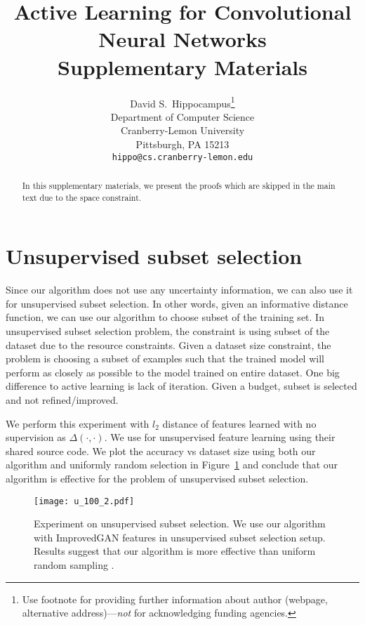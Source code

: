\documentclass{article}
\title{Active Learning for Convolutional Neural Networks\\ Supplementary Materials}
\author{
  David S.~Hippocampus\thanks{Use footnote for providing further
    information about author (webpage, alternative
    address)---\emph{not} for acknowledging funding agencies.} \\
  Department of Computer Science\\
  Cranberry-Lemon University\\
  Pittsburgh, PA 15213 \\
  \texttt{hippo@cs.cranberry-lemon.edu} \\
}
\begin{document}

\maketitle

\begin{abstract}
In this supplementary materials, we present the proofs which are skipped in the main text due to the space constraint.
\end{abstract}


\section{Unsupervised subset selection} 

Since our algorithm does not use any uncertainty information, we can also use it for unsupervised subset selection. In other words, given an informative distance function, we can use our algorithm to choose subset of the training set. In unsupervised subset selection problem, the constraint is using subset of the dataset due to the resource constraints. Given a dataset size constraint, the problem is choosing a subset of examples such that the trained model will perform as closely as possible to the model trained on entire dataset. One big difference to active learning is lack of iteration. Given a budget, subset is selected and not refined/improved.


We perform this experiment with $l_2$ distance of features learned with no supervision as $\Delta(\cdot,\cdot)$. We use \cite{improved_gan} for unsupervised feature learning using their shared source code. We plot the accuracy vs dataset size using both our algorithm and uniformly random selection in Figure~\ref{fig:scat} and conclude that our algorithm is effective for the problem of unsupervised subset selection.  

\begin{figure}[t]
\texttt{[image: u\_100\_2.pdf]}
\caption{Experiment on unsupervised subset selection. We use our algorithm with ImprovedGAN\cite{improved_gan} features in unsupervised subset selection setup. Results suggest that our algorithm is more effective than uniform random sampling .}
\label{fig:scat}
\end{figure}

 

\end{document}
